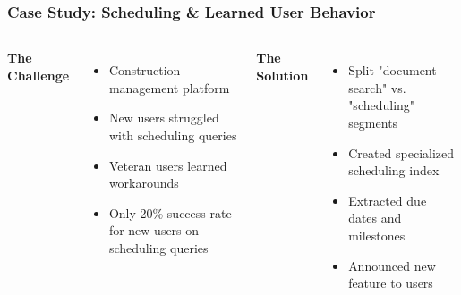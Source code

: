 \begin{frame}
    \frametitle{Case Study: Scheduling \& Learned User Behavior}
    
    \begin{columns}
        \textbf{The Challenge}
        \begin{itemize}
            \item Construction management platform
            \item New users struggled with scheduling queries
            \item Veteran users learned workarounds
            \item Only 20\% success rate for new users on scheduling queries
        \end{itemize}
        
        \textbf{The Solution}
        \begin{itemize}
            \item Split "document search" vs. "scheduling" segments
            \item Created specialized scheduling index
            \item Extracted due dates and milestones
            \item Announced new feature to users
        \end{itemize}
    \end{columns}
    
    \vspace{0.3cm}
    \begin{center}
    \end{center}
\end{frame} 